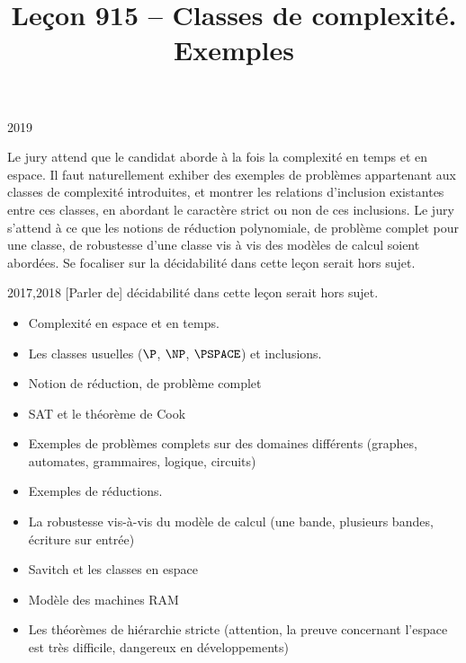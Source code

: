 \documentclass{agregfiche}
\title{Leçon 915 -- Classes de complexité. Exemples}
\begin{document}
\maketitle

\secrapports
\begin{rapport}{2019}

Le jury attend que le candidat aborde à la fois la complexité en temps et en
espace. Il faut naturellement exhiber des exemples de problèmes appartenant aux
classes de complexité introduites, et montrer les relations d’inclusion
existantes entre ces classes, en abordant le caractère strict ou non de ces
inclusions. Le jury s’attend à ce que les notions de réduction polynomiale, de
problème complet pour une classe, de robustesse d’une classe vis à vis des
modèles de calcul soient abordées. Se focaliser sur la décidabilité dans cette leçon
serait hors sujet.

\end{rapport}

\begin{rapport}{2017,2018}
 [Parler de] décidabilité dans cette leçon serait hors sujet.
\end{rapport}

\secindispensables

\begin{itemize}
    \item Complexité en espace et en temps.
    \item Les classes usuelles ($\P$, $\NP$, $\PSPACE$) et inclusions.
    \item Notion de réduction, de problème complet
    \item SAT et le théorème de Cook


\end{itemize}

\secasavoir

\begin{itemize}
	\item Exemples de problèmes complets sur des
          domaines différents (graphes, automates,
          grammaires, logique, circuits)
        \item Exemples de réductions.
	\item La robustesse vis-à-vis du modèle de calcul (une bande, plusieurs
          bandes, écriture sur entrée)
	\item Savitch et les classes en espace
        \item Modèle des machines RAM
        \item Les théorèmes de hiérarchie stricte (attention, la preuve concernant l'espace est très difficile, dangereux en développements)
\end{itemize}
\end{document}
